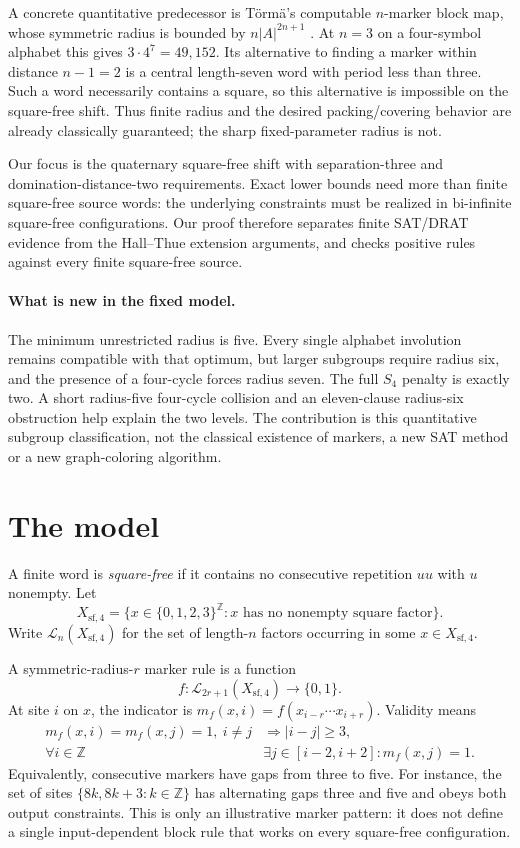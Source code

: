 \documentclass[11pt]{article}
\theoremstyle{remark}
\newcommand{\SigmaFour}{\{0,1,2,3\}}
\newcommand{\Xsf}{X_{\mathrm{sf},4}}
\newcommand{\Lang}{\mathcal{L}}
\begin{document}
A concrete quantitative predecessor is T{\"o}rm{\"a}'s computable
$n$-marker block map, whose symmetric radius is bounded by
$n|A|^{2n+1}$ \cite[Lemma~6.10]{torma2015structural}.
At $n=3$ on a four-symbol alphabet this gives
$3\cdot4^7=49{,}152$. Its alternative to finding a marker within
distance $n-1=2$ is a central length-seven word with period less
than three. Such a word necessarily contains a square, so this
alternative is impossible on the square-free shift. Thus finite
radius and the desired packing/covering behavior are already
classically guaranteed; the sharp fixed-parameter radius is not.

Our focus is the quaternary square-free shift with
separation-three and domination-distance-two requirements.
Exact lower bounds need more than finite square-free
source words: the underlying constraints must be realized
in bi-infinite square-free configurations. Our proof
therefore separates finite SAT/DRAT evidence from the
Hall--Thue extension arguments, and checks positive rules
against every finite square-free source.

\paragraph{What is new in the fixed model.}
The minimum unrestricted radius is five.
Every single alphabet involution remains compatible with
that optimum, but larger subgroups require radius six,
and the presence of a four-cycle forces radius seven.
The full $S_4$ penalty is exactly two. A short
radius-five four-cycle collision and an eleven-clause
radius-six obstruction help explain the two levels.
The contribution is this quantitative subgroup
classification, not the classical existence of markers,
a new SAT method or a new graph-coloring algorithm.

\section{The model}

A finite word is \emph{square-free} if it contains no consecutive
repetition $uu$ with $u$ nonempty. Let
\[
  \Xsf=\{x\in\SigmaFour^{\mathbb Z}:
          \text{$x$ has no nonempty square factor}\}.
\]
Write $\Lang_n(\Xsf)$ for the set of length-$n$ factors occurring in
some $x\in\Xsf$.

A symmetric-radius-$r$ marker rule is a function
\[
 f:\Lang_{2r+1}(\Xsf)\longrightarrow\{0,1\}.
\]
At site $i$ on $x$, the indicator is
$m_f(x,i)=f(x_{i-r}\cdots x_{i+r})$. Validity means
\begin{align}
 m_f(x,i)=m_f(x,j)=1,\ i\ne j
   &\Longrightarrow |i-j|\ge3, \label{eq:separation}\\
 \forall i\in\mathbb Z\quad
   &\exists j\in[i-2,i+2]\colon m_f(x,j)=1.
   \label{eq:domination}
\end{align}
Equivalently, consecutive markers have gaps from three to five.
For instance, the set of sites
$\{8k,8k+3:k\in\mathbb Z\}$ has alternating gaps
three and five and obeys both output constraints.
This is only an illustrative marker pattern: it does
not define a single input-dependent block rule that
works on every square-free configuration.
\end{document}
